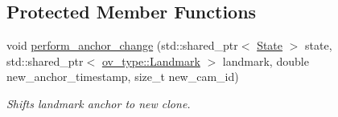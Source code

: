 \subsection*{Protected Member Functions}
\begin{DoxyCompactItemize}
\item 
void \hyperlink{classov__msckf_1_1UpdaterSLAM_a4910b23be6e7cf3a9f135330f657c501}{perform\+\_\+anchor\+\_\+change} (std\+::shared\+\_\+ptr$<$ \hyperlink{classov__msckf_1_1State}{State} $>$ state, std\+::shared\+\_\+ptr$<$ \hyperlink{classov__type_1_1Landmark}{ov\+\_\+type\+::\+Landmark} $>$ landmark, double new\+\_\+anchor\+\_\+timestamp, size\+\_\+t new\+\_\+cam\+\_\+id)
\begin{DoxyCompactList}\small\item\em Shifts landmark anchor to new clone. \end{DoxyCompactList}\end{DoxyCompactItemize}
